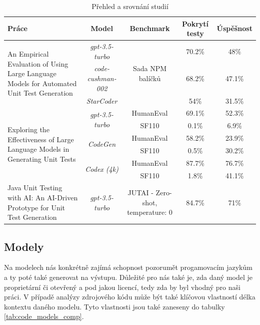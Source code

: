 \documentclass[czech, ma, kiv, he, iso690numb, pdf, viewonly]{fasthesis}
\begin{document}
    \newpage

    \begin{landscape}
            \vspace*{\fill}
            \begin{table}[H]
                \begin{tabular}{|p{6cm}|c|c|c|c|}
                    \hline
                    \textbf{Práce} & \textbf{Model} & \textbf{Benchmark} & \textbf{Pokrytí testy} & \textbf{Úspěšnost} \\
                    \hline
                    \multirow{3}{6cm}{An Empirical Evaluation of Using Large Language Models for Automated Unit Test Generation} & \textit{gpt-3.5-turbo} & \multirow{3}{*}{Sada NPM balíčků} & 70.2\% & 48\% \\
                     & \textit{code-cushman-002} & & 68.2\% & 47.1\% \\
                     & \textit{StarCoder} & & 54\% & 31.5\% \\
                    \hline
                    \multirow{6}{6cm}{Exploring the Effectiveness of Large Language
Models in Generating Unit Tests} & \multirow{2}{*}{\textit{gpt-3.5-turbo}} & HumanEval & 69.1\% & 52.3\% \\
                     & & SF110 & 0.1\% & 6.9\% \\
                     & \multirow{2}{*}{\textit{CodeGen}} & HumanEval & 58.2\% & 23.9\% \\
                     & & SF110 & 0.5\% & 30.2\% \\
                     & \multirow{2}{*}{\textit{Codex (4k)}} & HumanEval & 87.7\% & 76.7\% \\
                     & & SF110 & 1.8\% & 41.1\% \\
                    \hline
                    Java Unit Testing with AI: An AI-Driven Prototype for Unit Test Generation & \textit{gpt-3.5-turbo} & JUTAI - Zero-shot, temperature: \(0\) & 84.7\% & 71\% \\
                    \hline
                \end{tabular}
                \centering
                \caption{Přehled a srovnání studií}
                \label{tab:paper_comp}
            \end{table}
            \vspace*{\fill}
    \end{landscape}

    \subsection{Modely} \label{sec:research_models}
    Na  modelech nás konkrétně zajímá schopnost pozorumět progamovacím jazykům a ty poté také generovat na výstupu. Důležité pro nás také je, zda daný model je proprietární či otevřený a pod jakou licencí, tedy zda by byl vhodný pro naši práci. V případě analýzy zdrojového kódu může být také klíčovou vlastností délka kontextu daného modelu. Tyto vlastnosti jsou také zaneseny do tabulky \ref{tab:code_models_comp}.
\end{document}
